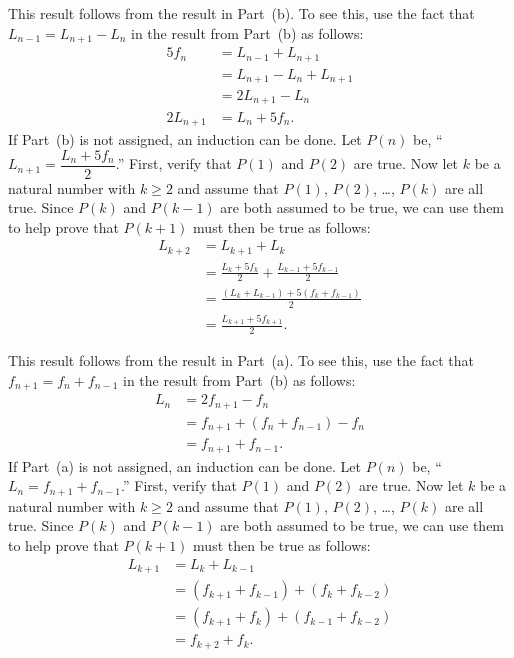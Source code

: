 \item This result follows from the result in Part~(b).  To see this, use the fact that 
$L_{n-1} = L_{n+1} - L_n$ in the result from Part~(b) as follows:
\begin{align*}
5f_n &= L_{n-1} + L_{n+1} \\
     &= L_{n+1} - L_n + L_{n+1} \\
     &= 2L_{n+1} - L_n \\
2L_{n+1} &= L_n + 5f_n.
\end{align*}
If Part~(b) is not assigned, an induction can be done.  Let $P(n)$ be, 
``$L_{n+1} = \dfrac{L_n + 5f_n}{2}$.''  First, verify that $P(1)$ and $P(2)$ are true.  Now let 
$k$ be a natural number with $k \geq 2$ and assume that $P(1)$, $P(2)$, \ldots, 
$P(k)$ are all true. Since $P(k)$ and $P(k-1)$ are both assumed to be true, we can use them to help prove that $P(k+1)$ must then be true as follows:
\begin{align*}
L_{k + 2} &= L_{k+1} + L_k \\
          &= \frac{L_k + 5f_k}{2} + \frac{L_{k-1} + 5f_{k-1}}{2} \\
          &= \frac{\left( L_k + L_{k-1} \right) + 5\left( f_k + f_{k-1} \right)}{2} \\
          &= \frac{L_{k+1} + 5f_{k+1}}{2}.
\end{align*}


\item This result follows from the result in Part~(a).  To see this, use the fact that 
$f_{n+1} = f_{n} + f_{n-1}$ in the result from Part~(b) as follows:
\begin{align*}
L_n &= 2f_{n+1} - f_n \\
    &= f_{n+1} + \left( f_n + f_{n-1} \right) - f_n \\
    &= f_{n+1} + f_{n-1}.
\end{align*}
If Part~(a) is not assigned, an induction can be done.  Let $P(n)$ be, 
``$L_n = f_{n+1} + f_{n-1}$.''  First, verify that $P(1)$ and $P(2)$ are true.  Now let 
$k$ be a natural number with $k \geq 2$ and assume that $P(1)$, $P(2)$, \ldots, 
$P(k)$ are all true. Since $P(k)$ and $P(k-1)$ are both assumed to be true, we can use them to help prove that $P(k+1)$ must then be true as follows:
\begin{align*}
L_{k+1} &= L_k + L_{k-1} \\
        &= \left( f_{k+1} + f_{k - 1} \right) + \left( f_k + f_{k-2} \right) \\
        &= \left( f_{k+1} + f_k \right) + \left( f_{k-1} + f_{k-2} \right) \\
        &= f_{k+2} + f_k.
\end{align*}


